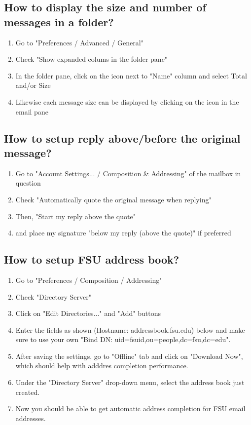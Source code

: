 \documentclass[12pt,a4paper]{article}
\begin{document}
\subsection*{How to display the size and number of messages in a folder?}
\begin{enumerate}
    \item Go to "Preferences / Advanced / General"
    \item Check "Show expanded colums in the folder pane"
    \item In the folder pane, click on the icon next to "Name" column and select Total and/or Size
    \item Likewise each message size can be displayed by clicking on the icon in the email pane
\end{enumerate}

\subsection*{How to setup reply above/before the original message?}
\begin{enumerate}
    \item Go to "Account Settings... / Composition \& Addressing" of the mailbox in question
    \item Check "Automatically quote the original message when replying"
    \item Then, "Start my reply above the quote"
    \item and place my signature "below my reply (above the quote)" if preferred
\end{enumerate}

\subsection*{How to setup FSU address book?}
\begin{enumerate}
    \item Go to "Preferences / Composition / Addressing"
    \item Check "Directory Server"
    \item Click on "Edit Directories..." and "Add" buttons
    \item Enter the fields as shown (Hostname: addressbook.fsu.edu) below and make sure to use your own "Bind DN: uid=fsuid,ou=people,dc=fsu,dc=edu".
    \item After saving the settings, go to "Offline" tab and click on "Download Now", which should help with adddres completion performance.
    \item Under the "Directory Server" drop-down menu, select the address book just created.
    \item Now you should be able to get automatic address completion for FSU email addresses.
\end{enumerate}
\end{document}
